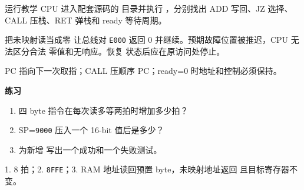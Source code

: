 
\begin{experimentbox}{运行教学 CPU}
进入配套源码的  目录并执行
，分别找出 ADD 写回、JZ 选择、CALL 压栈、RET
弹栈和 ready 等待周期。
\end{experimentbox}

\begin{faultinjectionbox}{把未映射读当成零}
让总线对 \texttt{E000} 返回 0 并继续。预期故障位置被推迟，CPU 无法区分合法
零值和无响应。恢复  状态后应在原访问处停止。
\end{faultinjectionbox}

\begin{pitfallbox}
PC 指向下一次取指；CALL 压顺序 PC；ready=0 时地址和控制必须保持。
\end{pitfallbox}

\textbf{练习}
\begin{enumerate}[leftmargin=2.2em]
  \item 四 byte 指令在每次读多等两拍时增加多少拍？
  \item SP=\texttt{9000} 压入一个 16-bit 值后是多少？
  \item 为新增  写出一个成功和一个失败测试。
\end{enumerate}
\begin{answerbox}
1. 8 拍；2. \texttt{8FFE}；3. RAM 地址读回预置 byte，未映射地址返回
 且目标寄存器不变。
\end{answerbox}
